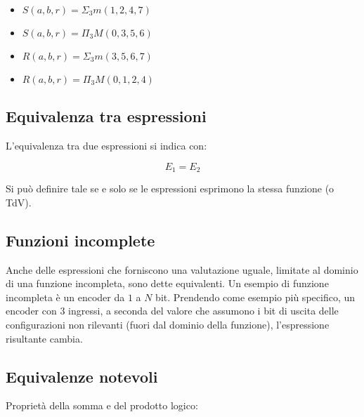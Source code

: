 \documentclass{subfiles}
\begin{document}
\begin{itemize}
    \item $S(a,b,r) = \Sigma_3 m(1,2,4,7)$
    \item $S(a,b,r) = \Pi_3 M(0,3,5,6)$
    \item $R(a,b,r) = \Sigma_3 m(3,5,6,7)$
    \item $R(a,b,r) = \Pi_3 M(0,1,2,4)$
\end{itemize}

\subsection{Equivalenza tra espressioni}

L'equivalenza tra due espressioni si indica con:

$$
E_1 = E_2
$$

\noindent
Si può definire tale se e solo se le espressioni esprimono la stessa funzione (o TdV).

\subsection{Funzioni incomplete}

Anche delle espressioni che forniscono una valutazione uguale, limitate al dominio di una funzione incompleta, sono dette equivalenti.
Un esempio di funzione incompleta è un encoder da $1$ a $N$ bit.
Prendendo come esempio più specifico, un encoder con 3 ingressi, a seconda del valore che assumono i bit di uscita delle configurazioni non rilevanti (fuori dal dominio della funzione), l'espressione risultante cambia.

\subsection{Equivalenze notevoli}

Proprietà della somma e del prodotto logico:
\end{document}
